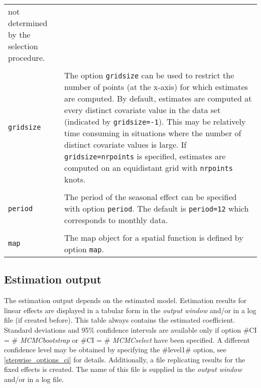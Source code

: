 \begin{longtable}{p{2.2cm} p{13.3cm}}
                 not determined by the selection procedure. \\
            & \\
{\tt gridsize} & The option {\tt gridsize} can be used to restrict the
                 number of points (at the x-axis) for which estimates are computed.
                 By default, estimates are computed at every distinct covariate
                 value in the data set (indicated by {\tt gridsize=-1}). This may be
                 relatively time consuming in situations where the number of
                 distinct covariate values is large. If {\tt gridsize=nrpoints} is
                 specified, estimates are computed
                 on an equidistant grid with {\tt nrpoints} knots. \\
            & \\
{\tt period} & The period of the seasonal effect can be specified with
               option {\tt period}. The default is {\tt period=12} which corresponds
               to monthly data. \\
            & \\
{\tt map} & The map object for a spatial function is defined by option {\tt map}.
\end{longtable}


\subsection{Estimation output}

The estimation output depends on the estimated
model. Estimation results for linear effects are displayed in a
tabular form in the {\em output window} and/or in a log file (if
created before). This table always contains the estimated coefficient.
Standard deviations and  95\% confidence intervals are available only
if option #CI = # {\em MCMCbootstrap} or
#CI = # {\em MCMCselect} have been specified.
A different confidence level may be obtained by specifying the
#level1# option, see \autoref{stepwise_options_ci} for details.
Additionally, a file replicating results for the fixed effects is
created. The name of this file is supplied in the {\em output
window} and/or in a log file.

